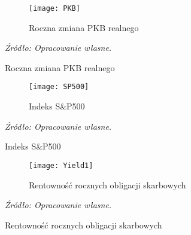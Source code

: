 \vspace{-1cm}

\hypertarget{fig102}{}
\begin{figure}[H]
\ContinuedFloat
\centering
\begin{subfigure}{.5\textwidth}
\caption{Roczna zmiana PKB realnego}
\hspace{-3cm}\texttt{[image: PKB]}
\end{subfigure}
\vspace{-0.75cm}
\begin{flushleft}
\hspace{1cm}\textit{\footnotesize{Źródło: Opracowanie własne.}} \\
\end{flushleft}
\end{figure}

\vspace{-1cm}

\hypertarget{fig103}{}
\begin{figure}[H]
\ContinuedFloat
\centering
\begin{subfigure}{.5\textwidth}
\caption{Indeks S\&P500}
\hspace{-3cm}\texttt{[image: SP500]}
\end{subfigure}
\vspace{-0.75cm}
\begin{flushleft}
\hspace{1cm}\textit{\footnotesize{Źródło: Opracowanie własne.}} \\
\end{flushleft}
\end{figure}

\vspace{-1cm}

\hypertarget{fig104}{}
\begin{figure}[H]
\ContinuedFloat
\centering
\begin{subfigure}{.5\textwidth}
\caption{Rentowność rocznych obligacji skarbowych}
\hspace{-3cm}\texttt{[image: Yield1]}
\end{subfigure}
\vspace{-0.75cm}
\begin{flushleft}
\hspace{1cm}\textit{\footnotesize{Źródło: Opracowanie własne.}} \\
\end{flushleft}
\end{figure}

